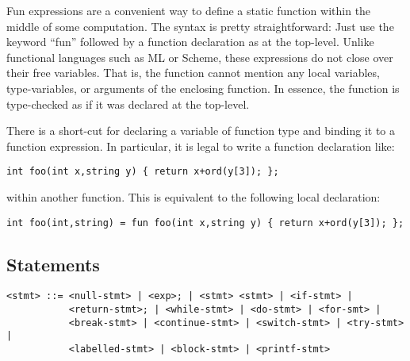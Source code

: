 \documentclass[titlepage,10pt]{article}
\begin{document}
Fun expressions are a convenient way to define a static function within
the middle of some computation.  The syntax is pretty straightforward:
Just use the keyword ``fun'' followed by a function declaration as at
the top-level.  Unlike functional languages such as ML or Scheme, these
expressions do not close over their free variables.  That is, the
function cannot mention any local variables, type-variables, or
arguments of the enclosing function.  In essence, the function is
type-checked as if it was declared at the top-level.

There is a short-cut for declaring a variable of function type and
binding it to a function expression.  In particular, it is legal to
write a function declaration like:


\begin{verbatim}
int foo(int x,string y) { return x+ord(y[3]); };
\end{verbatim}


within another function.  This is equivalent to the following local
declaration:


\begin{verbatim}
int foo(int,string) = fun foo(int x,string y) { return x+ord(y[3]); };
\end{verbatim}


\subsection{Statements\label{statements}}


\begin{verbatim}
<stmt> ::= <null-stmt> | <exp>; | <stmt> <stmt> | <if-stmt> |
           <return-stmt>; | <while-stmt> | <do-stmt> | <for-smt> |
           <break-stmt> | <continue-stmt> | <switch-stmt> | <try-stmt> |
           <labelled-stmt> | <block-stmt> | <printf-stmt>
\end{verbatim}
\end{document}
